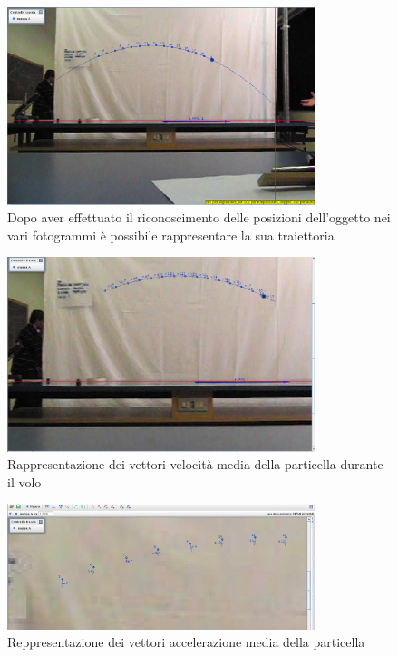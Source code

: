 \documentclass[a4paper,10pt,oneside]{article}
\begin{document}
\begin{figure}[H]
 \centering
 \includegraphics[width=0.8\textwidth]{./immagini/tracker_visualizzazione_traiettoria.png}
 \caption{Dopo aver effettuato il riconoscimento delle posizioni dell'oggetto nei vari fotogrammi è possibile rappresentare la sua traiettoria}
 \label{fig:visualizzazione_traiettoria}
\end{figure}

\begin{figure}[H]
 \centering
 \includegraphics[width=0.8\textwidth]{./immagini/tracker_visualizzazione_velocita.png}
 \caption{Rappresentazione dei vettori velocità media della particella durante il volo}
 \label{fig:visualizzazione_vel}
\end{figure}

\begin{figure}[H]
 \centering
 \includegraphics[width=0.8\textwidth]{./immagini/tracker_visualizzazione_accelerazione.png}
 \caption{Reppresentazione dei vettori accelerazione media della particella}
 \label{fig:vettori_acc}
\end{figure}
\end{document}
